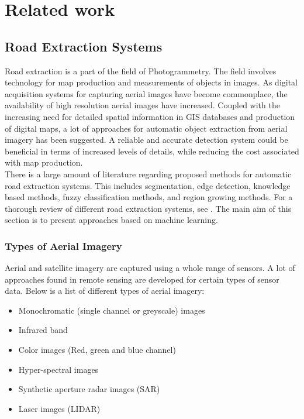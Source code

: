 \section{Related work}
\label{sec:related_works}
\subsection{Road Extraction Systems}
Road extraction is a part of the field of Photogrammetry. The field involves technology for map production and measurements of objects in images. As digital acquisition systems for capturing aerial images have become commonplace, the availability of high resolution aerial images have increased. Coupled with the increasing need for detailed spatial information in \ac{GIS} databases and production of digital maps, a lot of approaches for automatic object extraction from aerial imagery has been suggested. A reliable and accurate detection system could be beneficial in terms of increased levels of details, while reducing the cost associated with map production.\\

There is a large amount of literature regarding proposed methods for automatic road extraction systems. This includes segmentation, edge detection, knowledge based methods, fuzzy classification methods, and region growing methods. For a thorough review of different road extraction systems, see \citep{Trinder_towards_automation}
\citep{Mena_GIS_state_of_the_art}. The main aim of this section is to present approaches based on machine learning.

\subsubsection{Types of Aerial Imagery}
Aerial and satellite imagery are captured using a whole range of sensors. A lot of approaches found in remote sensing are developed for certain types of sensor data. Below is a list of different types of aerial imagery:
\begin{itemize}
 \item Monochromatic (single channel or greyscale) images 
 \item Infrared band
 \item Color images (Red, green and blue channel)
 \item Hyper-spectral images
 \item Synthetic aperture radar images (SAR)
 \item Laser images (LIDAR)
 \end{itemize}

